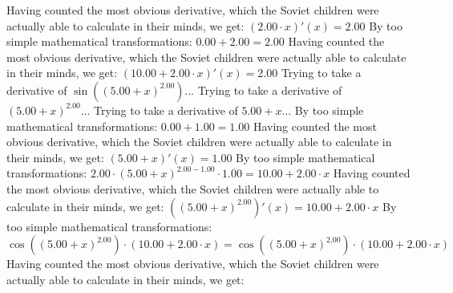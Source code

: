 \documentclass{article}
\begin{document}
Having counted the most obvious derivative, which the Soviet children were actually able to calculate in their minds, we get:
$({{2.00} \cdot {x}})'(x) = {2.00}$\newline
\newline
By too simple mathematical transformations:
 ${{0.00} + {2.00}} = {2.00}$ 
 \newline
 \newline 
Having counted the most obvious derivative, which the Soviet children were actually able to calculate in their minds, we get:
$({{10.00} + {{2.00} \cdot {x}}})'(x) = {2.00}$\newline
\newline
Trying to take a derivative of $ \sin {\left({\left({{5.00} + {x}}\right) ^ {2.00}}\right)} $...\newline
\newline
Trying to take a derivative of ${\left({{5.00} + {x}}\right) ^ {2.00}}$...\newline
\newline
Trying to take a derivative of ${{5.00} + {x}}$...\newline
\newline
By too simple mathematical transformations:
 ${{0.00} + {1.00}} = {1.00}$ 
 \newline
 \newline 
Having counted the most obvious derivative, which the Soviet children were actually able to calculate in their minds, we get:
$({{5.00} + {x}})'(x) = {1.00}$\newline
\newline
By too simple mathematical transformations:
 ${{{2.00} \cdot {\left({{5.00} + {x}}\right) ^ {{2.00} - {1.00}}}} \cdot {1.00}} = {{10.00} + {{2.00} \cdot {x}}}$ 
 \newline
 \newline 
Having counted the most obvious derivative, which the Soviet children were actually able to calculate in their minds, we get:
$({\left({{5.00} + {x}}\right) ^ {2.00}})'(x) = {{10.00} + {{2.00} \cdot {x}}}$\newline
\newline
By too simple mathematical transformations:
 ${ \cos {\left({\left({{5.00} + {x}}\right) ^ {2.00}}\right)}  \cdot \left({{10.00} + {{2.00} \cdot {x}}}\right)} = { \cos {\left({\left({{5.00} + {x}}\right) ^ {2.00}}\right)}  \cdot \left({{10.00} + {{2.00} \cdot {x}}}\right)}$ 
 \newline
 \newline 
Having counted the most obvious derivative, which the Soviet children were actually able to calculate in their minds, we get:
\end{document}
